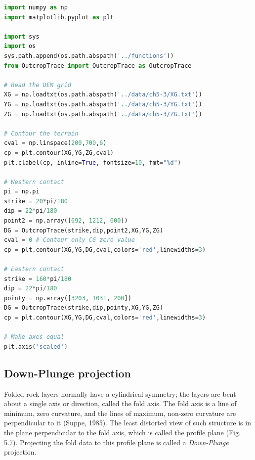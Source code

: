\documentclass[a4paper , 12pt]{book}
\begin{document}
\begin{center}
\begin{lstlisting}[language=Python, frame=single]
import numpy as np
import matplotlib.pyplot as plt

import sys
import os
sys.path.append(os.path.abspath('../functions'))
from OutcropTrace import OutcropTrace as OutcropTrace

# Read the DEM grid
XG = np.loadtxt(os.path.abspath('../data/ch5-3/XG.txt'))
YG = np.loadtxt(os.path.abspath('../data/ch5-3/YG.txt'))
ZG = np.loadtxt(os.path.abspath('../data/ch5-3/ZG.txt'))

# Contour the terrain
cval = np.linspace(200,700,6)
cp = plt.contour(XG,YG,ZG,cval)
plt.clabel(cp, inline=True, fontsize=10, fmt="%d")

# Western contact
pi = np.pi
strike = 20*pi/180
dip = 22*pi/180
point2 = np.array([692, 1212, 600])
DG = OutcropTrace(strike,dip,point2,XG,YG,ZG)
cval = 0 # Contour only CG zero value
cp = plt.contour(XG,YG,DG,cval,colors='red',linewidths=3)

# Eastern contact
strike = 160*pi/180
dip = 22*pi/180
pointy = np.array([3203, 1031, 200])
DG = OutcropTrace(strike,dip,pointy,XG,YG,ZG)
cp = plt.contour(XG,YG,DG,cval,colors='red',linewidths=3)

# Make axes equal
plt.axis('scaled')
\end{lstlisting}
\end{center}

\subsection{Down-Plunge projection}

Folded rock layers normally have a cylindrical symmetry; the layers are bent about a single axis or direction, called the fold axis. The fold axis is a line of minimum, zero curvature, and the lines of maximum, non-zero curvature are perpendicular to it (Suppe, 1985). The least distorted view of such structure is in the plane perpendicular to the fold axis, which is called the profile plane (Fig. 5.7). Projecting the fold data to this profile plane is called a \textit{Down-Plunge} projection.
\end{document}
